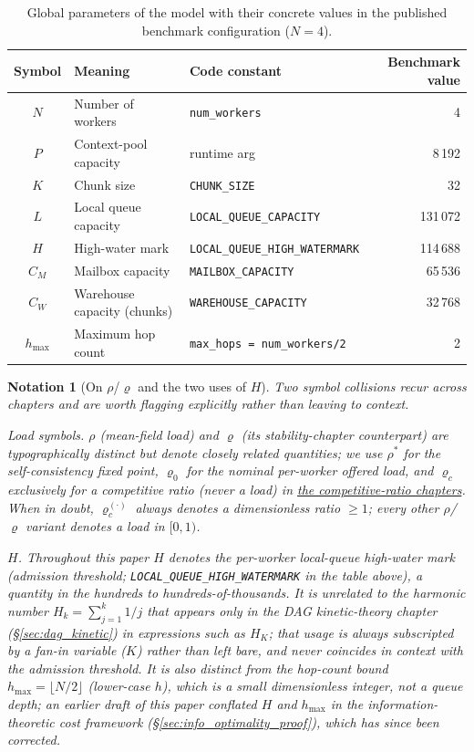 \documentclass[11pt,a4paper]{report}
\newtheorem{notation}{Notation}[section]
\newcommand{\code}[1]{\texttt{#1}}
\begin{document}
\begin{table}[H]
\centering
\small
\caption{Global parameters of the model with their concrete values in
the published benchmark configuration ($N=4$).}
\label{tab:params}
\begin{tabular}{cll r}
\toprule
Symbol & Meaning & Code constant & Benchmark value \\
\midrule
$N$        & Number of workers       & \code{num\_workers}              & 4 \\
$P$        & Context-pool capacity   & runtime arg                       & 8\,192 \\
$K$        & Chunk size              & \code{CHUNK\_SIZE}                & 32 \\
$L$        & Local queue capacity    & \code{LOCAL\_QUEUE\_CAPACITY}     & 131\,072 \\
$H$        & High-water mark         & \code{LOCAL\_QUEUE\_HIGH\_WATERMARK} & 114\,688 \\
$C_M$      & Mailbox capacity        & \code{MAILBOX\_CAPACITY}          & 65\,536 \\
$C_W$      & Warehouse capacity (chunks) & \code{WAREHOUSE\_CAPACITY}    & 32\,768 \\
$h_{\max}$ & Maximum hop count       & \code{max\_hops = num\_workers/2} & 2 \\
\bottomrule
\end{tabular}
\end{table}

\begin{notation}[On $\rho$/$\varrho$ and the two uses of $H$]
\label{not:symbols}
Two symbol collisions recur across chapters and are worth flagging
explicitly rather than leaving to context.

\emph{Load symbols.} $\rho$ (mean-field load) and $\varrho$ (its
stability-chapter counterpart) are typographically distinct but
denote closely related quantities; we use $\rho^*$ for the
self-consistency fixed point, $\varrho_0$ for the nominal per-worker
offered load, and $\varrho_c$ exclusively for a \emph{competitive
ratio} (never a load) in \hyperref[chap:competitive_ratio]{the
competitive-ratio chapters}. When in doubt, $\varrho_c^{(\cdot)}$ always
denotes a dimensionless ratio $\geq 1$; every other $\rho$/$\varrho$
variant denotes a load in $[0,1)$.

\emph{$H$.} Throughout this paper $H$ denotes the per-worker local-queue
\emph{high-water mark} (admission threshold; \code{LOCAL\_QUEUE\_HIGH\_WATERMARK}
in the table above), a quantity in the hundreds to hundreds-of-thousands.
It is unrelated to the \emph{harmonic number} $H_k = \sum_{j=1}^k 1/j$
that appears only in the DAG kinetic-theory chapter
(\S\ref{sec:dag_kinetic}) in expressions such as $H_K$; that usage is
always subscripted by a fan-in variable ($K$) rather than left bare, and
never coincides in context with the admission threshold. It is also
distinct from the \emph{hop-count bound} $h_{\max} = \lfloor N/2
\rfloor$ (lower-case $h$), which is a small dimensionless integer, not a
queue depth; an earlier draft of this paper conflated $H$ and $h_{\max}$
in the information-theoretic cost framework (\S\ref{sec:info_optimality_proof}),
which has since been corrected.
\end{notation}
\end{document}
